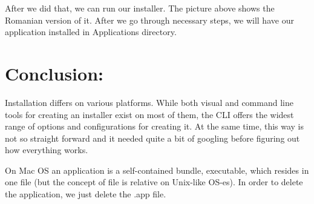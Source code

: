 \documentclass{article}        %
\begin{document}
	After we did that, we can run our installer. The picture above shows the Romanian version of it. After we go through necessary steps, we will have our application installed in Applications directory. 


\section*{Conclusion:}
	Installation differs on various platforms. While both visual and command line tools for creating an installer exist on most of them, the CLI offers the widest range of options and configurations for creating it. At the same time, this way is not so straight forward and it needed quite a bit of googling before figuring out how everything works. 

	On Mac OS an application is a self-contained bundle, executable, which resides in one file (but the concept of file is relative on Unix-like OS-es). In order to delete the application, we just delete the .app file. 
\end{document}
